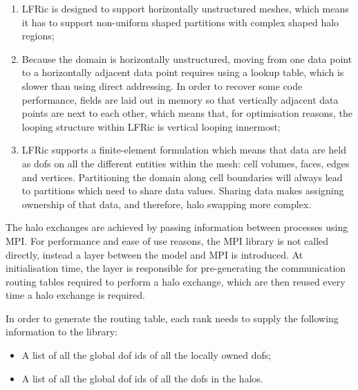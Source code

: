 \documentclass[review,times]{elsarticle}
\begin{document}
\begin{enumerate}

\item LFRic is designed to support horizontally unstructured meshes,
which means it has to support non-uniform shaped partitions with complex
shaped halo regions;

\item Because the domain is horizontally unstructured, moving from one
data point to a horizontally adjacent data point requires using a lookup
table, which is slower than using direct addressing. In order to recover
some code performance, fields are laid out in memory so that vertically
adjacent data points are next to each other, which means that, for
optimisation reasons, the looping structure within LFRic is vertical
looping innermost;

\item LFRic supports a finite-element formulation which means that data
are held as dofs on all the different
entities within the mesh: cell volumes, faces, edges and vertices.
Partitioning the domain along cell boundaries will always lead to
partitions which need to share data values. Sharing data makes assigning
ownership of that data, and therefore, halo swapping more complex.

\end{enumerate}

The halo exchanges are achieved by passing information between processes 
using MPI. For performance and ease of use reasons, the MPI library is not 
called directly, instead a layer between the model and MPI is introduced. 
At initialisation time, the layer is responsible for pre-generating the 
communication routing tables required to perform a halo exchange, which 
are then reused every time a halo exchange is required.

In order to generate the routing table, each rank needs to supply the
following information to the library:

\begin{itemize}

\item A list of all the global dof ids of all the locally owned dofs;

\item A list of all the global dof ids of all the dofs in the halos.

\end{itemize}
\end{document}
